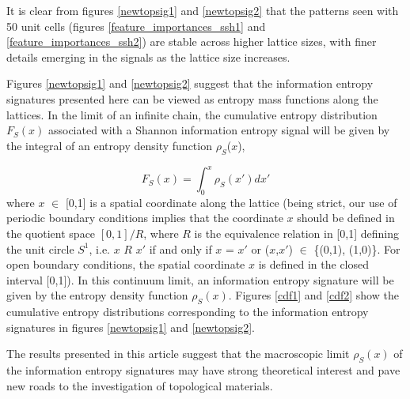 \documentclass[fleqn,10pt]{wlscirep}
\begin{document}
It is clear from figures \ref{newtopsig1} and \ref{newtopsig2} that the patterns seen with 50 unit cells (figures \ref{feature_importances_ssh1} and \ref{feature_importances_ssh2}) are stable across higher lattice sizes, with finer details emerging in the signals as the lattice size increases.

Figures \ref{newtopsig1} and \ref{newtopsig2} suggest that the information entropy signatures presented here can be viewed as entropy mass functions along the lattices. In the limit of an infinite chain, the cumulative entropy distribution $F_S(x)$ associated with a Shannon information entropy signal will be given by the integral of an entropy density function $\rho_S$($x$),

\begin{equation}
\label{entropy_dens}
F_S(x) = \int_{0}^x\rho_S(x')dx'
\end{equation}
where $x$ $\in$ [0,1] is a spatial coordinate along the lattice (being strict, our use of periodic boundary conditions implies that the coordinate $x$ should be defined in the quotient space $[0,1]/R$, where $R$ is the equivalence relation in [0,1] defining the unit circle $S^1$, i.e. $x$ $R$ $x'$ if and only if $x$ = $x'$ or ($x$,$x'$) $\in$ \{(0,1), (1,0)\}. For open boundary conditions, the spatial coordinate $x$ is defined in the closed interval [0,1]). In this continuum limit, an information entropy signature will be given by the entropy density function $\rho_S(x)$. Figures \ref{cdf1} and \ref{cdf2} show the cumulative entropy distributions corresponding to the information entropy signatures in figures \ref{newtopsig1} and \ref{newtopsig2}.

The results presented in this article suggest that the macroscopic limit $\rho_S(x)$ of the information entropy signatures may have strong theoretical interest and pave new roads to the investigation of topological materials.
\end{document}
